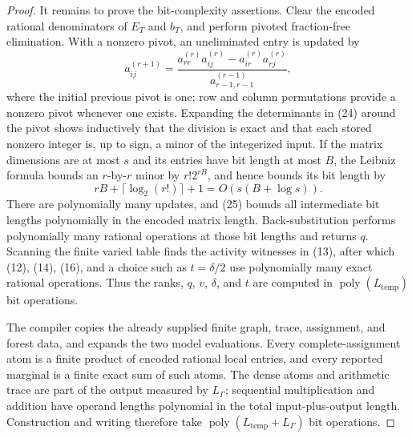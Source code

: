 \documentclass{article}
\begin{document}
\begin{proof}
It remains to prove the bit-complexity assertions.  Clear the encoded rational denominators of \(E_T\) and \(b_T\), and perform pivoted fraction-free elimination.  With a nonzero pivot, an uneliminated entry is updated by
\[
 a_{ij}^{(r+1)}
 =\frac{a_{rr}^{(r)}a_{ij}^{(r)}-a_{ir}^{(r)}a_{rj}^{(r)}}
        {a_{r-1,r-1}^{(r-1)}},                                 \tag{24}
\]
where the initial previous pivot is one; row and column permutations provide a nonzero pivot whenever one exists.  Expanding the determinants in (24) around the pivot shows inductively that the division is exact and that each stored nonzero integer is, up to sign, a minor of the integerized input.  If the matrix dimensions are at most \(s\) and its entries have bit length at most \(B\), the Leibniz formula bounds an \(r\)-by-\(r\) minor by \(r!2^{rB}\), and hence bounds its bit length by
\[
 rB+\lceil\log_2(r!)\rceil+1
 =O\!\left(s(B+\log s)\right).                               \tag{25}
\]
There are polynomially many updates, and (25) bounds all intermediate bit lengths polynomially in the encoded matrix length.  Back-substitution performs polynomially many rational operations at those bit lengths and returns \(q\).  Scanning the finite varied table finds the activity witnesses in (13), after which (12), (14), (16), and a choice such as \(t=\delta/2\) use polynomially many exact rational operations.  Thus the ranks, \(q\), \(v\), \(\delta\), and \(t\) are computed in \(\operatorname{poly}(L_{\mathrm{temp}})\) bit operations.

The compiler copies the already supplied finite graph, trace, assignment, and forest data, and expands the two model evaluations.  Every complete-assignment atom is a finite product of encoded rational local entries, and every reported marginal is a finite exact sum of such atoms.  The dense atoms and arithmetic trace are part of the output measured by \(L_\Gamma\); sequential multiplication and addition have operand lengths polynomial in the total input-plus-output length.  Construction and writing therefore take \(\operatorname{poly}(L_{\mathrm{temp}}+L_\Gamma)\) bit operations.


\end{proof}
\end{document}
